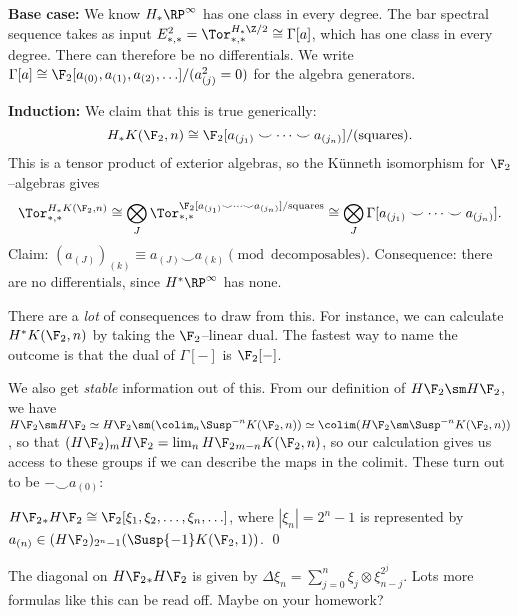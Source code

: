 \textbf{Base case:} We know $H_* \RP^\infty$ has one class in every degree.  The bar spectral sequence takes as input $E_{*, *}^2 = \Tor^{H_* \Z/2}_{*, *} \cong \Gamma[a]$, which has one class in every degree.  There can therefore be no differentials.  We write $\Gamma[a] \cong \F_2[a_{(0)}, a_{(1)}, a_{(2)}, \ldots] / (a_{(j)}^2 = 0)$ for the algebra generators.

\textbf{Induction:} We claim that this is true generically: \[H_* K(\F_2, n) \cong \F_2[a_{(j_1)} \smile \cdots \smile a_{(j_n)}] / (\text{squares}).\]  This is a tensor product of exterior algebras, so the K\"unneth isomorphism for $\F_2$--algebras gives \[\Tor^{H_* K(\F_2, n)}_{*, *} \cong \bigotimes_J \Tor^{\F_2[a_{(j_1)} \smile \cdots \smile a_{(j_n)}] / \text{squares}}_{*, *} \cong \bigotimes_J \Gamma[a_{(j_1)} \smile \cdots \smile a_{(j_n)}].\]  Claim: $(a_{(J)})_{(k)} \equiv a_{(J)} \smile a_{(k)} \pmod{\text{decomposables}}$.  Consequence: there are no differentials, since $H^* \RP^\infty$ has none.

There are a \emph{lot} of consequences to draw from this.  For instance, we can calculate $H^* K(\F_2, n)$ by taking the $\F_2$--linear dual.  The fastest way to name the outcome is that the dual of $\Gamma[-]$ is $\F_2[-]$.

We also get \emph{stable} information out of this.  From our definition of $H\F_2 \sm H\F_2$, we have $H\F_2 \sm H\F_2 \simeq H\F_2 \sm (\colim_n \Susp^{-n} K(\F_2, n)) \simeq \colim (H\F_2 \sm \Susp^{-n} K(\F_2, n))$, so that $(H\F_2)_m H\F_2 = \lim_n H\F_2{}_{m-n} K(\F_2, n)$, so our calculation gives us access to these groups if we can describe the maps in the colimit.  These turn out to be $- \smile a_{(0)}$:
\begin{center}
\end{center}

\begin{corollary}
$H\F_2{}_* H\F_2 \cong \F_2[\xi_1, \xi_2, \ldots, \xi_n, \ldots]$, where $|\xi_n| = 2^n - 1$ is represented by $a_{(n)} \in (H\F_2)_{2^n-1}(\Susp{-1} K(\F_2, 1))$. \qed
\end{corollary}
The diagonal on $H\F_2{}_* H\F_2$ is given by $\Delta \xi_n = \sum_{j=0}^n \xi_j \otimes \xi_{n-j}^{2^j}$.  Lots more formulas like this can be read off.  Maybe on your homework?

